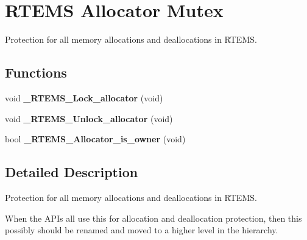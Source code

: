 \hypertarget{group__RTEMSScoreAllocatorMutex}{}\section{R\+T\+E\+MS Allocator Mutex}
\label{group__RTEMSScoreAllocatorMutex}


Protection for all memory allocations and deallocations in R\+T\+E\+MS.  


\subsection*{Functions}
\begin{DoxyCompactItemize}
\item 
\mbox{\label{group__RTEMSScoreAllocatorMutex_ga89aa77edce0d5557b1a7e9d9ef7999c8}} 
void {\bfseries \+\_\+\+R\+T\+E\+M\+S\+\_\+\+Lock\+\_\+allocator} (void)
\item 
\mbox{\label{group__RTEMSScoreAllocatorMutex_ga15d657c04537c2ad1841adc28b8dd747}} 
void {\bfseries \+\_\+\+R\+T\+E\+M\+S\+\_\+\+Unlock\+\_\+allocator} (void)
\item 
\mbox{\label{group__RTEMSScoreAllocatorMutex_ga8698c4f98051e1c097ed32e38fbf786f}} 
bool {\bfseries \+\_\+\+R\+T\+E\+M\+S\+\_\+\+Allocator\+\_\+is\+\_\+owner} (void)
\end{DoxyCompactItemize}


\subsection{Detailed Description}
Protection for all memory allocations and deallocations in R\+T\+E\+MS. 

When the A\+P\+Is all use this for allocation and deallocation protection, then this possibly should be renamed and moved to a higher level in the hierarchy. 